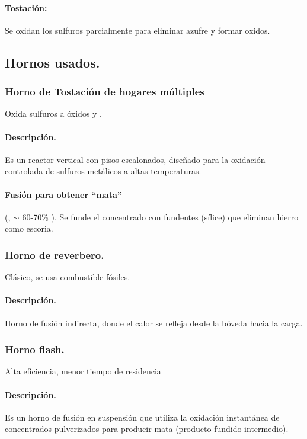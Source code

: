 \documentclass[12pt,a4paper]{article}
\begin{document}
\paragraph{Tostación:} Se oxidan los sulfuros parcialmente para eliminar azufre y formar oxidos.

\subsection{Hornos usados.}

\subsubsection{Horno de Tostación de hogares múltiples} 
Oxida sulfuros a óxidos y .  

\paragraph{Descripción.} Es un reactor vertical con pisos escalonados, diseñado para la oxidación controlada de sulfuros metálicos a altas temperaturas. 

\paragraph{Fusión para obtener \enquote{mata}} (, $\sim$ 60-70\% ). Se funde el concentrado con fundentes (sílice) que eliminan hierro como escoria.

\subsubsection{Horno de reverbero.}

Clásico, se usa combustible fósiles.

\paragraph{Descripción.} Horno de fusión indirecta, donde el calor se refleja desde la bóveda hacia la carga.

\subsubsection{Horno flash.} 

Alta eficiencia, menor tiempo de residencia

\paragraph{Descripción.} Es un horno de fusión en suspensión que utiliza la oxidación instantánea de concentrados pulverizados para producir mata (producto fundido intermedio).
\end{document}
